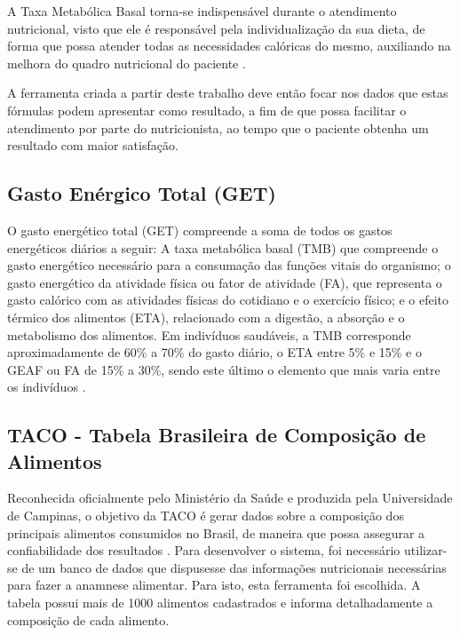 A Taxa Metabólica Basal torna-se indispensável durante o atendimento nutricional, visto
que ele é responsável pela individualização da sua dieta, de forma que possa atender
todas as necessidades calóricas do mesmo, auxiliando na melhora do quadro
nutricional do paciente \cite{pedrosa}.

A ferramenta criada a partir deste trabalho deve então focar nos dados que estas fórmulas podem apresentar
como resultado, a fim de que possa facilitar o atendimento por parte do nutricionista,
ao tempo que o paciente obtenha um resultado com maior satisfação.


\subsection{Gasto Enérgico Total (GET)}

O gasto energético total (GET) compreende a soma de todos os gastos energéticos diários a seguir: A
taxa metabólica basal (TMB) que compreende o gasto energético necessário para a
consumação das funções vitais do organismo; o gasto energético da atividade física
ou fator de atividade (FA), que representa o gasto calórico com as atividades físicas
do cotidiano e o exercício físico; e o efeito térmico dos alimentos (ETA), relacionado
com a digestão, a absorção e o metabolismo dos alimentos. Em indivíduos saudáveis,
a TMB corresponde aproximadamente de 60\% a 70\% do gasto diário, o ETA entre 5\% 
e 15\% e o GEAF ou FA de 15\% a 30\%, sendo este último o elemento que mais varia
entre os indivíduos \cite{hill}. 

\subsection{TACO - Tabela Brasileira de Composição de Alimentos}

Reconhecida oficialmente pelo Ministério da Saúde e produzida pela Universidade de Campinas, o objetivo da TACO é gerar dados sobre a composição dos principais alimentos consumidos no Brasil, de maneira que possa assegurar a confiabilidade dos resultados \cite{taco}. 
Para desenvolver o sistema, foi necessário utilizar-se de um banco de dados que dispusesse das informações nutricionais necessárias para fazer a anamnese alimentar. Para isto, esta ferramenta foi escolhida. A tabela possui mais de 1000 alimentos cadastrados e informa detalhadamente a composição de cada alimento.
